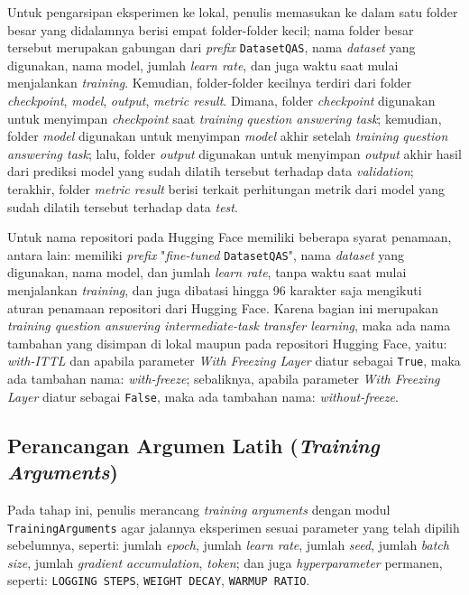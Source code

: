 Untuk pengarsipan eksperimen ke lokal, penulis memasukan ke dalam satu folder besar yang didalamnya berisi empat folder-folder kecil; nama folder besar tersebut merupakan gabungan dari \emph{prefix} \texttt{DatasetQAS}, nama \emph{dataset} yang digunakan, nama model, jumlah \emph{learn rate}, dan juga waktu saat mulai menjalankan \emph{training}. Kemudian, folder-folder kecilnya terdiri dari folder \emph{checkpoint}, \emph{model}, \emph{output}, \emph{metric result}. Dimana, folder \emph{checkpoint} digunakan untuk menyimpan \emph{checkpoint} saat \emph{training} \emph{question answering task}; kemudian, folder \emph{model} digunakan untuk menyimpan \emph{model} akhir setelah \emph{training} \emph{question answering task}; lalu, folder \emph{output} digunakan untuk menyimpan \emph{output} akhir hasil dari prediksi model yang sudah dilatih tersebut terhadap data \emph{validation}; terakhir, folder \emph{metric result} berisi terkait perhitungan metrik dari model yang sudah dilatih tersebut terhadap data \emph{test}. 

Untuk nama repositori pada Hugging Face memiliki beberapa syarat penamaan, antara lain: memiliki \emph{prefix} "\emph{fine-tuned} \texttt{DatasetQAS}", nama \emph{dataset} yang digunakan, nama model, dan jumlah \emph{learn rate}, tanpa waktu saat mulai menjalankan \emph{training}, dan juga dibatasi hingga 96 karakter saja mengikuti aturan penamaan repositori dari Hugging Face. Karena bagian ini merupakan \emph{training question answering intermediate-task transfer learning}, maka ada nama tambahan yang disimpan di lokal maupun pada repositori Hugging Face, yaitu: \emph{with-ITTL} dan apabila parameter \emph{With Freezing Layer} diatur sebagai \texttt{True}, maka ada tambahan nama: \emph{with-freeze}; sebaliknya, apabila parameter \emph{With Freezing Layer} diatur sebagai \texttt{False}, maka ada tambahan nama: \emph{without-freeze}.

\subsection{Perancangan Argumen Latih (\emph{Training Arguments})}
Pada tahap ini, penulis merancang \emph{training arguments} dengan modul \texttt{TrainingArguments} agar jalannya eksperimen sesuai parameter yang telah dipilih sebelumnya, seperti: jumlah \emph{epoch}, jumlah \emph{learn rate}, jumlah \emph{seed}, jumlah \emph{batch size}, jumlah \emph{gradient accumulation}, \emph{token}; dan juga \emph{hyperparameter} permanen, seperti:  \texttt{LOGGING STEPS}, \texttt{WEIGHT DECAY}, \texttt{WARMUP RATIO}. 

